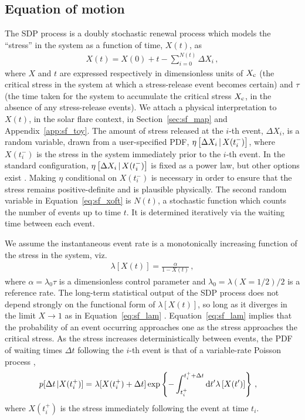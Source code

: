 \subsection{Equation of motion} \label{sec:sf_eom}
The SDP process is a doubly stochastic renewal process which models the ``stress'' in the system as a function of time, $X(t)$, as
\begin{eqnarray}
{X(t) = X(0) + t - \sum_{i=0}^{N(t)}\Delta X_{i}}\,, \label{eq:sf_xoft}
\end{eqnarray}
where $X$ and $t$ are expressed respectively in dimensionless units of $X_\textrm{c}$ (the critical stress in the system at which a stress-release event becomes certain) and $\tau$ (the time taken for the system to accumulate the critical stress $X_\textrm{c}$, in the absence of any stress-release events). We attach a physical interpretation to $X(t)$, in the solar flare context, in Section~\ref{sec:sf_map} and Appendix~\ref{app:sf_toy}. The amount of stress released at the $i$-th event, $\Delta X_{i}$, is a random variable, drawn from a user-specified PDF, $\eta\left[\Delta X_{i}\,|\,X(t_i^-)\right]$, where $X(t_i^-)$ is the stress in the system immediately prior to the $i$-th event. In the standard configuration, $\eta\left[\Delta X_{i}\,|\,X(t_i^-)\right]$ is fixed as a power law, but other options exist \citep{Carlin2019quasi, Carlin2021endog}. Making $\eta$ conditional on $X(t_i^-)$ is necessary in order to ensure that the stress remains positive-definite and is plausible physically. The second random variable in Equation~\eqref{eq:sf_xoft} is $N(t)$, a stochastic function which counts the number of events up to time $t$. It is determined iteratively via the waiting time between each event. 

We assume the instantaneous event rate is a monotonically increasing function of the stress in the system, viz.
\begin{eqnarray}
{\lambda[X(t)] = \frac{\alpha}{1 - X(t)}}\,, \label{eq:sf_lam}
\end{eqnarray}
where $\alpha = \lambda_0 \tau$ is a dimensionless control parameter and $\lambda_0 = \lambda(X=1/2)/2$ is a reference rate. The long-term statistical output of the SDP process does not depend strongly on the functional form of $\lambda[X(t)]$, so long as it diverges in the limit $X \rightarrow 1$ as in Equation~\eqref{eq:sf_lam} \citep{Fulgenzi2017, Carlin2019quasi}. Equation~\eqref{eq:sf_lam} implies that the probability of an event occurring approaches one as the stress approaches the critical stress. As the stress increases deterministically between events, the PDF of waiting times $\Delta t$ following the $i$-th event is that of a variable-rate Poisson process \citep{Cox1955, Fulgenzi2017},
\begin{eqnarray}
p[\Delta t\,|X(t_i^+)] =&~ \lambda[X(t_i^+) + \Delta t] \exp \left\{ -\int_{t_i^+}^{t_i^+ + \Delta t}\textrm{d} t' \lambda \left[ X(t') \right]\right\}\,, \label{eq:sf_pdelt}
\end{eqnarray}
where $X(t_i^+)$ is the stress immediately following the event at time $t_i$.  

